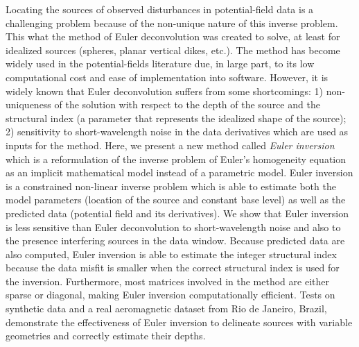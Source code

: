 Locating the sources of observed disturbances in potential-field data is a challenging problem because of the non-unique nature of this inverse problem.
This what the method of Euler deconvolution was created to solve, at least for idealized sources (spheres, planar vertical dikes, etc.).
The method has become widely used in the potential-fields literature due, in large part, to its low computational cost and ease of implementation into software.
However, it is widely known that Euler deconvolution suffers from some shortcomings: 1) non-uniqueness of the solution with respect to the depth of the source and the structural index (a parameter that represents the idealized shape of the source); 2) sensitivity to short-wavelength noise in the data derivatives which are used as inputs for the method.
Here, we present a new method called \textit{Euler inversion} which is a reformulation of the inverse problem of Euler's homogeneity equation as an implicit mathematical model instead of a parametric model.
Euler inversion is a constrained non-linear inverse problem which is able to estimate both the model parameters (location of the source and constant base level) as well as the predicted data (potential field and its derivatives).
We show that Euler inversion is less sensitive than Euler deconvolution to short-wavelength noise and also to the presence interfering sources in the data window.
Because predicted data are also computed, Euler inversion is able to estimate the integer structural index because the data misfit is smaller when the correct structural index is used for the inversion.
Furthermore, most matrices involved in the method are either sparse or diagonal, making Euler inversion computationally efficient.
Tests on synthetic data and a real aeromagnetic dataset from Rio de Janeiro, Brazil, demonstrate the effectiveness of Euler inversion to delineate sources with variable geometries and correctly estimate their depths.
